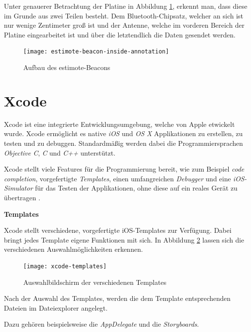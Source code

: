 Unter genauerer Betrachtung der Platine in Abbildung \ref{estimote-beacon-inside-annotations}, erkennt man, dass diese im Grunde aus zwei Teilen besteht.
Dem Bluetooth-Chipsatz, welcher an sich ist nur wenige Zentimeter groß ist und der Antenne, welche im vorderen Bereich der Platine eingearbeitet ist und über die letztendlich die Daten gesendet werden.

\begin{figure}[h!]
	\centering
	\texttt{[image: estimote-beacon-inside-annotation]}
	\caption{Aufbau des estimote-Beacons}
	\label{estimote-beacon-inside-annotations}
\end{figure}



\section{Xcode}
\label{sec:tools:xcode}
Xcode ist eine integrierte Entwicklungsumgebung, welche von Apple etwickelt wurde. Xcode ermöglicht es native \emph{iOS} und \emph{OS X} Applikationen zu erstellen, zu testen und zu debuggen.
Standardmäßig werden dabei die Programmiersprachen \emph{Objective C}, \emph{C} und \emph{C++} unterstützt.

Xcode stellt viele Features für die Programmierung bereit, wie zum Beispiel \emph{code completion}, vorgefertigte \emph{Templates}, einen umfangreichen \emph{Debugger} und eine \emph{iOS-Simulator} für das Testen der Applikationen, ohne diese auf ein reales Gerät zu übertragen \cite{xcodeinfo}.


\textbf{Templates}

Xcode stellt verschiedene, vorgefertigte iOS-Templates zur Verfügung. 
Dabei bringt jedes Template eigene Funktionen mit sich. In Abbildung \ref{xcode-templates} lassen sich die verschiedenen Auswahlmöglichkeiten erkennen.

\begin{figure}[htb!]
		\centering
	\texttt{[image: xcode-templates]}
	\caption{Auswahlbildschirm der verschiedenen Templates}
	\label{xcode-templates}
\end{figure}

Nach der Auswahl des Templates, werden die dem Template entsprechenden Dateien im Dateiexplorer angelegt.


Dazu gehören beispielsweise die \emph{AppDelegate} und die \emph{Storyboards}.

